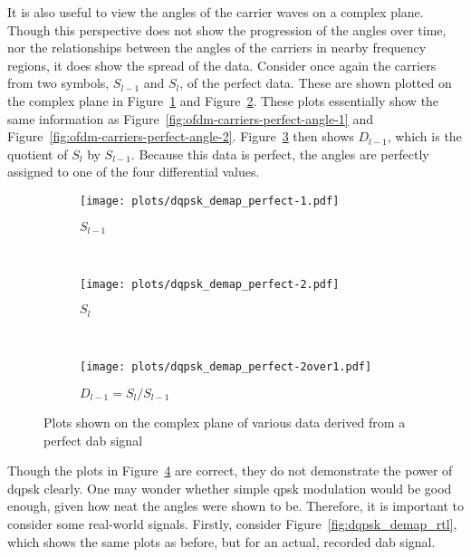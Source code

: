 \documentclass[class=report,11pt,crop=false]{standalone}
\begin{document}
It is also useful to view the angles of the carrier waves on a complex plane. Though this perspective does not show the progression of the angles over time, nor the relationships between the angles of the carriers in nearby frequency regions, it does show the spread of the data. Consider once again the carriers from two symbols, \(S_{l-1}\) and \(S_{l}\), of the perfect data. These are shown plotted on the complex plane in Figure~\ref{fig:dqpsk_demap_perfect-1} and Figure~\ref{fig:dqpsk_demap_perfect-2}. These plots essentially show the same information as Figure~\ref{fig:ofdm-carriers-perfect-angle-1} and Figure~\ref{fig:ofdm-carriers-perfect-angle-2}. Figure~\ref{fig:dqpsk_demap_perfect-2over1} then shows \(D_{l-1}\), which is the quotient of \(S_{l}\) by \(S_{l-1}\). Because this data is perfect, the angles are perfectly assigned to one of the four differential values.

\begin{figure}[htbp]
  \centering
  \captionsetup{type=figure}
  \begin{subfigure}[t]{0.3\textwidth}
    \centering
    \captionsetup{type=figure}
    \texttt{[image: plots/dqpsk\_demap\_perfect-1.pdf]}
    \caption{\(S_{l-1}\)}
    \label{fig:dqpsk_demap_perfect-1}
  \end{subfigure}%
  ~ 
  \begin{subfigure}[t]{0.3\textwidth}
    \centering
    \captionsetup{type=figure}
    \texttt{[image: plots/dqpsk\_demap\_perfect-2.pdf]}
    \caption{\(S_{l}\)}
    \label{fig:dqpsk_demap_perfect-2}
  \end{subfigure}
  ~ 
  \begin{subfigure}[t]{0.3\textwidth}
    \centering
    \captionsetup{type=figure}
    \texttt{[image: plots/dqpsk\_demap\_perfect-2over1.pdf]}
    \caption{\(D_{l-1} = S_{l}/S_{l-1}\)}
    \label{fig:dqpsk_demap_perfect-2over1}
  \end{subfigure}
  \caption{Plots shown on the complex plane of various data derived from a perfect \gls{dab} signal}
  \label{fig:dqpsk_demap_perfect}
\end{figure}

Though the plots in Figure~\ref{fig:dqpsk_demap_perfect} are correct, they do not demonstrate the power of \gls{dqpsk} clearly. One may wonder whether simple \gls{qpsk} modulation would be good enough, given how neat the angles were shown to be. Therefore, it is important to consider some real-world signals. Firstly, consider Figure~\ref{fig:dqpsk_demap_rtl}, which shows the same plots as before, but for an actual, recorded \gls{dab} signal.
\end{document}
